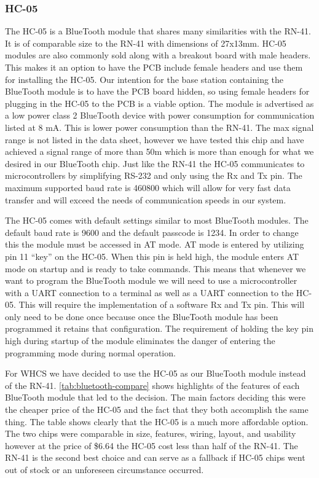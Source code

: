 \subsubsection{HC-05}
\label{sec:bt-hc-05}
The HC{}-05 is a BlueTooth module that shares many similarities with the
RN{}-41. It is of comparable size to the RN{}-41 with dimensions of 27x13mm.
HC{}-05 modules are also commonly sold along with a breakout board with male
headers. This makes it an option to have the PCB include female headers and use
them for installing the HC{}-05. Our intention for the base station containing
the BlueTooth module is to have the PCB board hidden, so using female headers
for plugging in the HC{}-05 to the PCB is a viable option. The module is
advertised as a low power class 2 BlueTooth device with power consumption for
communication listed at 8 mA. This is lower power consumption than the RN{}-41.
The max signal range is not listed in the data sheet, however we have tested
this chip and have achieved a signal range of more than 50m which is more than
enough for what we desired in our BlueTooth chip. Just like the RN{}-41 the
HC{}-05 communicates to microcontrollers by simplifying RS{}-232 and only using
the Rx and Tx pin. The maximum supported baud rate is 460800 which will allow
for very fast data transfer and will exceed the needs of communication speeds
in our system.

The HC{}-05 comes with default settings similar to most BlueTooth modules. The
default baud rate is 9600 and the default passcode is 1234. In order to change
this the module must be accessed in AT mode. AT mode is entered by utilizing
pin 11 {}``key{}'' on the HC{}-05. When this pin is held high, the module
enters AT mode on startup and is ready to take commands. This means that
whenever we want to program the BlueTooth module we will need to use a
microcontroller with a UART connection to a terminal as well as a UART
connection to the HC{}-05. This will require the implementation of a software
Rx and Tx pin. This will only need to be done once because once the BlueTooth
module has been programmed it retains that configuration. The requirement of
holding the key pin high during startup of the module eliminates the danger of
entering the programming mode during normal operation.

For WHCS we have decided to use the HC{}-05 as our BlueTooth module instead of
the RN{}-41. \autoref{tab:bluetooth-compare} shows highlights of the features of each
BlueTooth module that led to the decision. The main factors deciding this were
the cheaper price of the HC{}-05 and the fact that they both accomplish the
same thing. The table shows clearly that the HC{}-05 is a much more affordable
option. The two chips were comparable in size, features, wiring, layout, and
usability however at the price of \$6.64 the HC{}-05 cost less than half of the
RN{}-41. The RN{}-41 is the second best choice and can serve as a fallback if
HC{}-05 chips went out of stock or an unforeseen circumstance occurred.

